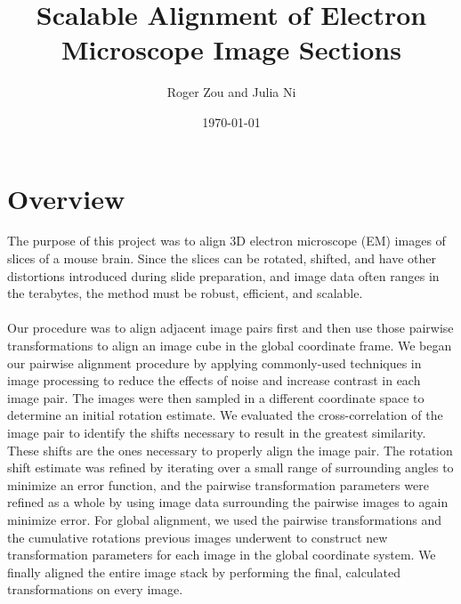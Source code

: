 \documentclass{article}
\author{Roger Zou and Julia Ni}
\date{\today}
\title{Scalable Alignment of Electron Microscope Image Sections}
\begin{document}
  
\maketitle
 
\section{Overview}
The purpose of this project was to align 3D electron microscope (EM) images of slices of a mouse brain. Since the slices can be rotated, shifted, and have other distortions introduced during slide preparation, and image data often ranges in the terabytes, the method must be robust, efficient, and scalable.\\
\\
Our procedure was to align adjacent image pairs first and then use those pairwise transformations to align an image cube in the global coordinate frame. We began our pairwise alignment procedure by applying commonly-used techniques in image processing to reduce the effects of noise and increase contrast in each image pair. The images were then sampled in a different coordinate space to determine an initial rotation estimate. We evaluated the cross-correlation of the image pair to identify the shifts necessary to result in the greatest similarity. These shifts are the ones necessary to properly align the image pair. The rotation shift estimate was refined by iterating over a small range of surrounding angles to minimize an error function, and the pairwise transformation parameters were refined as a whole by using image data surrounding the pairwise images to again minimize error. For global alignment, we used the pairwise transformations and the cumulative rotations previous images underwent to construct new transformation parameters for each image in the global coordinate system. We finally aligned the entire image stack by performing the final, calculated transformations on every image.
\end{document}
